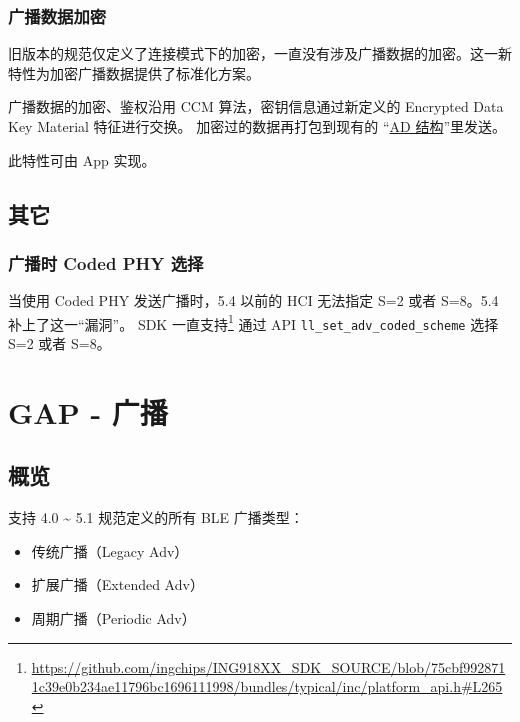 \documentclass[
  12pt,
]{book}
\providecommand{\tightlist}{%
  \setlength{\itemsep}{0pt}\setlength{\parskip}{0pt}}
\begin{document}
\hypertarget{ux5e7fux64adux6570ux636eux52a0ux5bc6}{%
\subsection{广播数据加密}\label{ux5e7fux64adux6570ux636eux52a0ux5bc6}}

旧版本的规范仅定义了连接模式下的加密，一直没有涉及广播数据的加密。这一新特性为加密广播数据提供了标准化方案。

广播数据的加密、鉴权沿用 CCM 算法，密钥信息通过新定义的 Encrypted Data Key Material 特征进行交换。
加密过的数据再打包到现有的 ``\protect\hyperlink{ch-overview-comm-model}{AD 结构}''里发送。

此特性可由 App 实现。

\hypertarget{ux5176ux5b83}{%
\section{其它}\label{ux5176ux5b83}}

\hypertarget{ux5e7fux64adux65f6-coded-phy-ux9009ux62e9}{%
\subsection{广播时 Coded PHY 选择}\label{ux5e7fux64adux65f6-coded-phy-ux9009ux62e9}}

当使用 Coded PHY 发送广播时，5.4 以前的 HCI 无法指定 S=2 或者 S=8。5.4 补上了这一``漏洞''。
SDK 一直支持\footnote{\url{https://github.com/ingchips/ING918XX_SDK_SOURCE/blob/75cbf9928711c39e0b234ae11796bc1696111998/bundles/typical/inc/platform_api.h\#L265}}
通过 API \texttt{ll\_set\_adv\_coded\_scheme} 选择 S=2 或者 S=8。

\hypertarget{ch-adv}{%
\chapter{GAP - 广播}\label{ch-adv}}

\hypertarget{ux6982ux89c8}{%
\section{概览}\label{ux6982ux89c8}}

支持 4.0 \textasciitilde{} 5.1 规范定义的所有 BLE 广播类型：

\begin{itemize}
\tightlist
\item
  传统广播（Legacy Adv）
\item
  扩展广播（Extended Adv）
\item
  周期广播（Periodic Adv）
\end{itemize}
\end{document}
